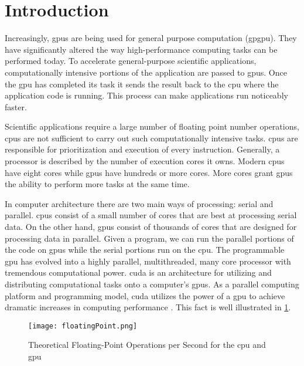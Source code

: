 \section{Introduction}

Increasingly, \Glspl{gpu} are being used for general purpose computation
(\gls{gpgpu}). They have significantly altered the way high-performance
computing tasks can be performed today. To accelerate general-purpose
scientific applications, computationally intensive portions of the application
are passed to \glspl{gpu}. Once the \gls{gpu} has completed its task it sends
the result back to the \Gls{cpu} where the application code is running. This
process can make applications run noticeably faster.

Scientific applications require a large number of floating point number
operations, \Glspl{cpu} are not sufficient to carry out such computationally
intensive tasks. \glspl{cpu} are responsible for prioritization and execution
of every instruction. Generally, a processor is described by the number of
execution cores it owns. Modern \glspl{cpu} have eight cores while \Glspl{gpu}
have hundreds or more cores. More cores grant \glspl{gpu} the ability to
perform more tasks at the same time.

In computer architecture there are two main ways of processing: serial and
parallel. \Glspl{cpu} consist of a small number of cores that are best at
processing serial data. On the other hand, \glspl{gpu} consist of thousands of
cores that are designed for processing data in parallel. Given a program, we
can run the parallel portions of the code on \glspl{gpu} while the serial
portions run on the \gls{cpu}\@. The programmable \gls{gpu} has evolved into a
highly parallel, multithreaded, many core processor with tremendous
computational power. \Gls{cuda} is an architecture for utilizing and
distributing computational tasks onto a computer's \glspl{gpu}. As a parallel
computing platform and programming model, \gls{cuda} utilizes the power of a
\gls{gpu} to achieve dramatic increases in computing performance
\cite{website:cudaCProgrammingGuide}. This fact is well illustrated in
\cref{fig:flops_gpu_vs_cpu}.

\begin{figure}[htb]
\centering
\texttt{[image: floatingPoint.png]}
\caption{Theoretical Floating-Point Operations per Second for the \gls{cpu} and
         \gls{gpu} \cite{website:cudaCProgrammingGuide}}
\label{fig:flops_gpu_vs_cpu}
\end{figure}

